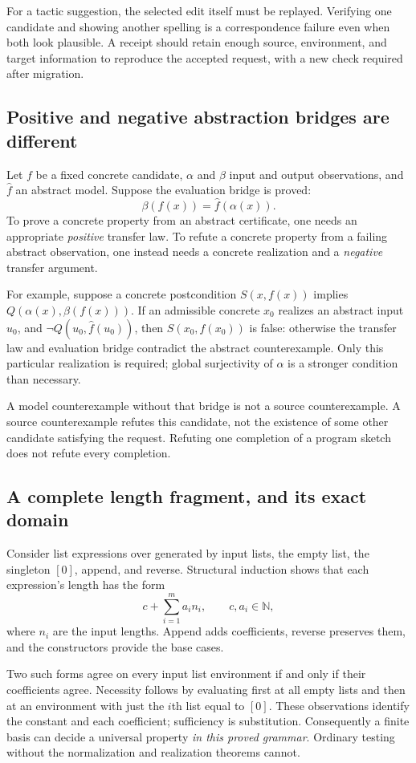 \documentclass[11pt,a4paper]{article}
\theoremstyle{definition}
\theoremstyle{remark}
\newcommand{\code}[1]{\texttt{\detokenize{#1}}}
\newcommand{\NN}{\mathbb N}
\begin{document}
For a tactic suggestion, the selected edit itself must be replayed. Verifying
one candidate and showing another spelling is a correspondence failure even
when both look plausible. A receipt should retain enough source, environment,
and target information to reproduce the accepted request, with a new check
required after migration.

\subsection{Positive and negative abstraction bridges are different}
Let $f$ be a fixed concrete candidate, $\alpha$ and $\beta$ input and output
observations, and $\widehat f$ an abstract model. Suppose the evaluation bridge
is proved:
\[
 \beta(f(x))=\widehat f(\alpha(x)).
\]
To prove a concrete property from an abstract certificate, one needs an
appropriate \emph{positive} transfer law. To refute a concrete property from a
failing abstract observation, one instead needs a concrete realization and a
\emph{negative} transfer argument.

For example, suppose a concrete postcondition $S(x,f(x))$ implies
$Q(\alpha(x),\beta(f(x)))$. If an admissible concrete $x_0$ realizes an abstract
input $u_0$, and $\neg Q(u_0,\widehat f(u_0))$, then $S(x_0,f(x_0))$ is false:
otherwise the transfer law and evaluation bridge contradict the abstract
counterexample. Only this particular realization is required; global
surjectivity of $\alpha$ is a stronger condition than necessary.

A model counterexample without that bridge is not a source counterexample.
A source counterexample refutes this candidate, not the existence of some other
candidate satisfying the request. Refuting one completion of a program sketch
does not refute every completion.

\subsection{A complete length fragment, and its exact domain}
Consider list expressions over \code{List Nat} generated by input lists,
the empty list, the singleton $[0]$, append, and reverse. Structural induction
shows that each expression's length has the form
\[
 c+\sum_{i=1}^m a_i n_i,\qquad c,a_i\in\NN,
\]
where $n_i$ are the input lengths. Append adds coefficients, reverse preserves
them, and the constructors provide the base cases.

Two such forms agree on every input list environment if and only if their
coefficients agree. Necessity follows by evaluating first at all empty lists
and then at an environment with just the $i$th list equal to $[0]$. These
observations identify the constant and each coefficient; sufficiency is
substitution. Consequently a finite basis can decide a universal property
\emph{in this proved grammar}. Ordinary testing without the normalization
and realization theorems cannot.
\end{document}
